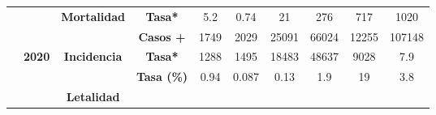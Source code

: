 \begin{tabular}{lccc|cccccc|}
		\multicolumn{1}{l|}{} &
		\multicolumn{1}{c|}{\cellcolor[HTML]{FFD9C0}} &
		\multicolumn{1}{c|}{\multirow{-2}{*}{\cellcolor[HTML]{FFD9C0}\textbf{Mortalidad}}} &
		\cellcolor[HTML]{FFD9C0}\textbf{Tasa*} &
		\multicolumn{1}{c|}{\cellcolor[HTML]{FFD9C0}5.2} &
		\multicolumn{1}{c|}{\cellcolor[HTML]{FFD9C0}0.74} &
		\multicolumn{1}{c|}{\cellcolor[HTML]{FFD9C0}21} &
		\multicolumn{1}{c|}{\cellcolor[HTML]{FFD9C0}276} &
		\multicolumn{1}{c|}{\cellcolor[HTML]{FFD9C0}717} &
		\cellcolor[HTML]{FFD9C0}1020 \\ \cline{3-10} 
		\multicolumn{1}{l|}{} &
		\multicolumn{1}{c|}{\cellcolor[HTML]{FFD9C0}} &
		\multicolumn{1}{c|}{\cellcolor[HTML]{FFD9C0}} &
		\cellcolor[HTML]{FFD9C0}\textbf{Casos +} &
		\multicolumn{1}{c|}{\cellcolor[HTML]{FFD9C0}1749} &
		\multicolumn{1}{c|}{\cellcolor[HTML]{FFD9C0}2029} &
		\multicolumn{1}{c|}{\cellcolor[HTML]{FFD9C0}25091} &
		\multicolumn{1}{c|}{\cellcolor[HTML]{FFD9C0}66024} &
		\multicolumn{1}{c|}{\cellcolor[HTML]{FFD9C0}12255} &
		\cellcolor[HTML]{FFD9C0}107148 \\ \cline{4-10} 
		\multicolumn{1}{l|}{} &
		\multicolumn{1}{c|}{\multirow{-6}{*}{\cellcolor[HTML]{FFD9C0}\textbf{2020}}} &
		\multicolumn{1}{c|}{\multirow{-2}{*}{\cellcolor[HTML]{FFD9C0}\textbf{Incidencia}}} &
		\cellcolor[HTML]{FFD9C0}\textbf{Tasa*} &
		\multicolumn{1}{c|}{\cellcolor[HTML]{FFD9C0}1288} &
		\multicolumn{1}{c|}{\cellcolor[HTML]{FFD9C0}1495} &
		\multicolumn{1}{c|}{\cellcolor[HTML]{FFD9C0}18483} &
		\multicolumn{1}{c|}{\cellcolor[HTML]{FFD9C0}48637} &
		\multicolumn{1}{c|}{\cellcolor[HTML]{FFD9C0}9028} &
		\cellcolor[HTML]{FFD9C0}7.9 \\ \cline{2-10} 
		\multicolumn{1}{l|}{} &
		\multicolumn{1}{c|}{\cellcolor[HTML]{FAF0D7}} &
		\multicolumn{1}{c|}{\cellcolor[HTML]{FAF0D7}} &
		\cellcolor[HTML]{FAF0D7}\textbf{Tasa (\%)} &
		\multicolumn{1}{c|}{\cellcolor[HTML]{FAF0D7}0.94} &
		\multicolumn{1}{c|}{\cellcolor[HTML]{FAF0D7}0.087} &
		\multicolumn{1}{c|}{\cellcolor[HTML]{FAF0D7}0.13} &
		\multicolumn{1}{c|}{\cellcolor[HTML]{FAF0D7}1.9} &
		\multicolumn{1}{c|}{\cellcolor[HTML]{FAF0D7}19} &
		\cellcolor[HTML]{FAF0D7}3.8 \\ \cline{4-10} 
		\multicolumn{1}{l|}{} &
		\multicolumn{1}{c|}{\cellcolor[HTML]{FAF0D7}} &
		\multicolumn{1}{c|}{\multirow{-2}{*}{\cellcolor[HTML]{FAF0D7}\textbf{Letalidad}}} &
		\cellcolor[HTML]{FAF0D7} &
		\multicolumn{1}{c|}{\cellcolor[HTML]{FAF0D7}} &
		\multicolumn{1}{c|}{\cellcolor[HTML]{FAF0D7}} &
		\multicolumn{1}{c|}{\cellcolor[HTML]{FAF0D7}} &
		\multicolumn{1}{c|}{\cellcolor[HTML]{FAF0D7}} &

\end{tabular}
